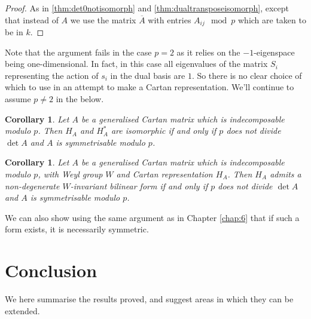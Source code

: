 \documentclass[11pt,a4paper]{report}
\newtheorem{corollary}[theorem]{Corollary}
\theoremstyle{definition}
\begin{document}
\begin{proof}
    As in \ref{thm:det0notisomorph} and \ref{thm:dualtransposeisomorph}, except that instead of $A$ we use the matrix $\overline{A}$ with entries $A_{ij} \mod p$ which are taken to be in $k$.
\end{proof}

 Note that the argument fails in the case $p = 2$ as it relies on the $-1$-eigenspace being one-dimensional. In fact, in this case all eigenvalues of the matrix $S_i$ representing the action of $s_i$ in the dual basis are $1$. So there is no clear choice of which to use in an attempt to make a Cartan representation. We'll continue to assume $p \neq 2$ in the below. 

\begin{corollary}
    Let $A$ be a generalised Cartan matrix which is indecomposable modulo $p$. Then $H_A$ and $H_A^*$ are isomorphic if and only if $p$ does not divide $\det A$ and $A$ is symmetrisable modulo $p$.
\end{corollary}

\begin{corollary}
    Let $A$ be a generalised Cartan matrix which is indecomposable modulo $p$, with Weyl group $W$ and Cartan representation $H_A$. Then $H_A$ admits a non-degenerate $W$-invariant bilinear form if and only if $p$ does not divide $\det A$ and $A$ is symmetrisable modulo $p$. 
\end{corollary}

We can also show using the same argument as in Chapter \ref{chap:6} that if such a form exists, it is necessarily symmetric. 

\chapter{Conclusion}

\label{chap:8}
We here summarise the results proved, and suggest areas in which they can be extended. 
\end{document}

